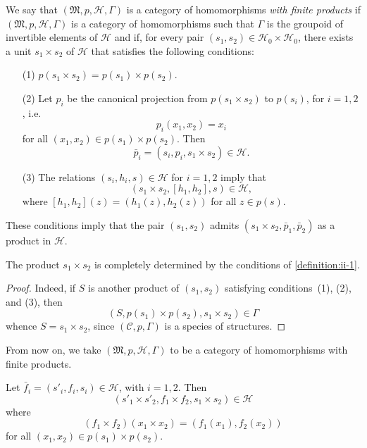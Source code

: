 \documentclass[a4paper,fleqn]{article}
\theoremstyle{plain}
\newenvironment{proposition}[1]
  {\renewcommand\theinnerproposition{#1}\innerproposition}
  {\endinnerproposition}
\theoremstyle{definition}
\newenvironment{definition}[1]
  {\renewcommand\theinnerdefinition{#1}\innerdefinition}
  {\endinnerdefinition}
\newcommand{\oldpage}[1]{{\marginpar{\footnotesize$\bigg\vert$\,\,\,\,\textit{p.~#1}}}}
\newcommand{\CC}{\mathcal{C}}
\newcommand{\HH}{\mathcal{H}}
\newcommand{\MM}{\mathfrak{M}}
\begin{document}
\begin{definition}{1}
\label{definition:ii-1}
  We say that $(\MM,p,\HH,\Gamma)$ is a category of homomorphisms \emph{with finite products} if $(\MM,p,\HH,\Gamma)$ is a category of homomorphisms such that $\Gamma$ is the groupoid of invertible elements of $\HH$ and if, for every pair $(s_1,s_2)\in\HH_0\times\HH_0$, there exists a unit $s_1\times s_2$ of $\HH$ that satisfies the following conditions:
  
  \begin{enumerate}
    \item[\normalfont(1)]
      $p(s_1\times s_2)=p(s_1)\times p(s_2)$.

    \item[\normalfont(2)]
      Let $p_i$ be the canonical projection from $p(s_1\times s_2)$ to $p(s_i)$, for $i=1,2$, i.e.
      \[
        p_i(x_1,x_2) = x_i
      \]
      for all $(x_1,x_2)\in p(s_1)\times p(s_2)$.
      Then
      \[
        \bar{p}_i
        = (s_i,p_i,s_1\times s_2)
        \in\HH.
      \]

    \item[\normalfont(3)]
      The relations $(s_i,h_i,s)\in\HH$ for $i=1,2$ imply that
      \[
        (s_1\times s_2,[h_1,h_2],s)
        \in\HH,
      \]
      where $[h_1,h_2](z)=(h_1(z),h_2(z))$ for all $z\in p(s)$.
  \end{enumerate}
\end{definition}

These conditions imply that the pair $(s_1,s_2)$ admits $(s_1\times s_2,\bar{p}_1,\bar{p}_2)$ as a product \cite{4} in $\HH$.

\begin{proposition}{1}
\label{proposition:ii-1}
  The product $s_1\times s_2$ is completely determined by the conditions of \cref{definition:ii-1}.
\end{proposition}

\begin{proof}
  Indeed, if $S$ is another product of $(s_1,s_2)$ satisfying conditions~(1), (2), and (3), then
  \[
    (S,p(s_1)\times p(s_2),s_1\times s_2)
    \in\Gamma
  \]
  whence $S=s_1\times s_2$, since $(\CC,p,\Gamma)$ is a species of structures.
\end{proof}

From now on, we take $(\MM,p,\HH,\Gamma)$ to be a category of homomorphisms with finite products.

\begin{proposition}{2}
\label{proposition:ii-2}
  Let $\bar{f}_i=(s'_i,f_i,s_i)\in\HH$, with $i=1,2$.
  Then
  \[
    (s'_1\times s'_2, f_1\times f_2, s_1\times s_2)
    \in\HH
  \]
  \oldpage{382}
  where
  \[
    (f_1\times f_2)(x_1\times x_2)
    = (f_1(x_1),f_2(x_2))
  \]
  for all $(x_1,x_2)\in p(s_1)\times p(s_2)$.
\end{proposition}
\end{document}
